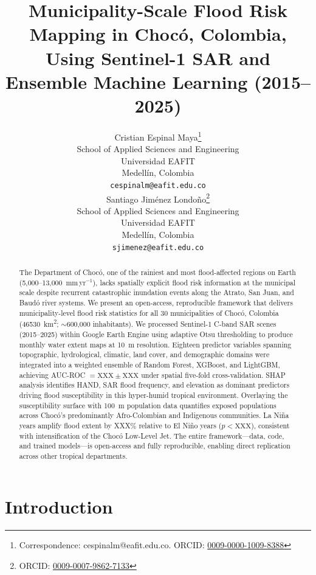 \documentclass{article}
\title{Municipality-Scale Flood Risk Mapping in Choc\'o, Colombia, Using Sentinel-1 SAR and Ensemble Machine Learning (2015--2025)}
\author{
  Cristian Espinal Maya\thanks{Correspondence: cespinalm@eafit.edu.co. ORCID: \href{https://orcid.org/0009-0000-1009-8388}{0009-0000-1009-8388}} \\
  School of Applied Sciences and Engineering\\
  Universidad EAFIT\\
  Medell\'in, Colombia \\
  \texttt{cespinalm@eafit.edu.co} \\
  \And
  Santiago Jim\'enez Londo\~no\thanks{ORCID: \href{https://orcid.org/0009-0007-9862-7133}{0009-0007-9862-7133}} \\
  School of Applied Sciences and Engineering\\
  Universidad EAFIT\\
  Medell\'in, Colombia \\
  \texttt{sjimenez@eafit.edu.co} \\
}
\begin{document}
\maketitle

\begin{abstract}
The Department of Choc\'o, one of the rainiest and most flood-affected regions on Earth (5,000--13,000~mm\,yr$^{-1}$), lacks spatially explicit flood risk information at the municipal scale despite recurrent catastrophic inundation events along the Atrato, San Juan, and Baud\'o river systems. We present an open-access, reproducible framework that delivers municipality-level flood risk statistics for all 30 municipalities of Choc\'o, Colombia (\SI{46530}{\kilo\metre\squared}; $\sim$600,000 inhabitants). We processed Sentinel-1 C-band SAR scenes (2015--2025) within Google Earth Engine using adaptive Otsu thresholding to produce monthly water extent maps at \SI{10}{\metre} resolution. Eighteen predictor variables spanning topographic, hydrological, climatic, land cover, and demographic domains were integrated into a weighted ensemble of Random Forest, XGBoost, and LightGBM, achieving AUC-ROC $= \text{XXX} \pm \text{XXX}$ under spatial five-fold cross-validation. SHAP analysis identifies HAND, SAR flood frequency, and elevation as dominant predictors driving flood susceptibility in this hyper-humid tropical environment. Overlaying the susceptibility surface with \SI{100}{\metre} population data quantifies exposed populations across Choc\'o's predominantly Afro-Colombian and Indigenous communities. La Ni\~na years amplify flood extent by XXX\% relative to El Ni\~no years ($p < \text{XXX}$), consistent with intensification of the Choc\'o Low-Level Jet. The entire framework---data, code, and trained models---is open-access and fully reproducible, enabling direct replication across other tropical departments.
\end{abstract}


\section{Introduction}
\label{sec:introduction}
\end{document}
